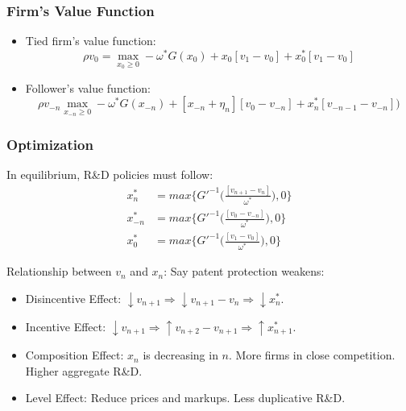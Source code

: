 \documentclass{beamer}
\begin{document}
\begin{frame}[t]\frametitle{Firm's Value Function} 
  \begin{itemize}
    \item<+-> Tied firm's value function:
      \begin{equation*} \label{eq:rvf_tied}
        \rho v_0 = \max_{x_0 \geq 0} -\omega^*G(x_{0}) + x_{0}[v_1 - v_0] + x_0^*[v_{1} - v_0]
      \end{equation*}

    \item<+-> Follower's value function:
      \begin{equation*} \label{eq:rvf_follower}
        \rho v_{-n} \max_{x_{-n} \geq 0} -\omega^*G(x_{-n}) + [x_{-n} + \eta_n][v_0 - v_{-n}] + x_n^*[v_{-n-1} - v_{-n}])
      \end{equation*}
  \end{itemize}
\end{frame}

\begin{frame}[t]\frametitle{Optimization} 
  In equilibrium, R\&D policies must follow:
  \begin{align*} \label{eq:ss_rd_policies}
    x_n^*    &= max \big\{G'^{-1}\Bigg(\frac{[v_{n+1} - v_n]}{\omega^*}\Bigg)   ,0\}\\
    x_{-n}^* &= max \big\{G'^{-1}\Bigg(\frac{[v_0  - v_{-n}]}{\omega^*}\Bigg)   ,0\}\\
    x_0^*    &= max \big\{G'^{-1}\Bigg(\frac{[v_1     - v_0]}{\omega^*}\Bigg)   ,0\}
  \end{align*}

  Relationship between $v_n$ and $x_n$: Say patent protection weakens:
  \begin{itemize}
    \item<2-> Disincentive Effect: $\downarrow v_{n+1} \Rightarrow \downarrow v_{n+1} - v_n \Rightarrow \downarrow x_n^*$.
    \item<3-> Incentive Effect: $\downarrow v_{n+1} \Rightarrow \uparrow v_{n+2} - v_{n+1} \Rightarrow \uparrow x_{n+1}^*$.
    \item<4-> Composition Effect: $x_n$ is decreasing in $n$. More firms in close competition. Higher aggregate R\&D.
    \item<5-> Level Effect: Reduce prices and markups.  Less duplicative R\&D.
  \end{itemize}
\end{frame}
\end{document}
